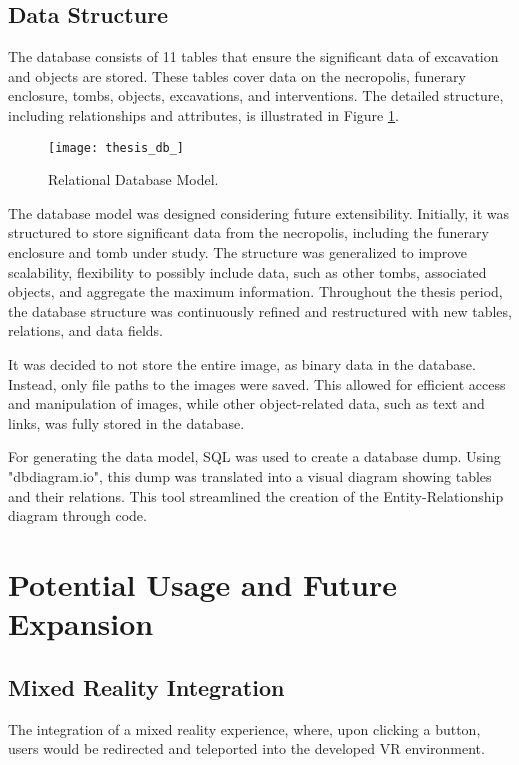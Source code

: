 \subsection{Data Structure}

The database consists of 11 tables that ensure the significant data of excavation and objects are stored. %
These tables cover data on the necropolis, funerary enclosure, tombs, objects, excavations, and interventions.
The detailed structure, including relationships and attributes, is illustrated in Figure \ref{fig:database}.

\begin{figure}[h!]
    \centering
    \texttt{[image: thesis\_db\_]}
    \caption{Relational Database Model.} 
    \label{fig:database}
\end{figure}


The database model was designed considering future extensibility. Initially, it was structured to store significant data from the necropolis, including the funerary enclosure and tomb under study. The structure was generalized to improve scalability, flexibility to possibly include data, such as other tombs, associated objects, and aggregate the maximum information. 
Throughout the thesis period, the database structure was continuously refined and restructured with new tables, relations, and data fields.

It was decided to not store the entire image, as binary data in the database. Instead, only file paths to the images were saved. This allowed for efficient access and manipulation of images, while other object-related data, such as text and links, was fully stored in the database.

For generating the data model, SQL was used to create a database dump.
Using "dbdiagram.io", this dump was translated into a visual diagram showing tables and their relations. This tool streamlined the creation of the Entity-Relationship diagram through code.


\section{Potential Usage and Future Expansion}

\subsection{Mixed Reality Integration}
The integration of a mixed reality experience, where, upon clicking a button, users would be redirected and teleported into the developed VR environment. 

